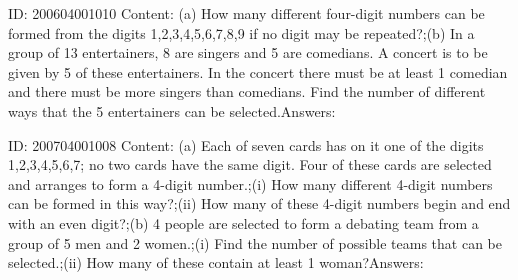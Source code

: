 \documentclass{article}
\begin{document}
ID: 200604001010
Content:
(a)	How many different four-digit numbers can be formed from the digits 1,2,3,4,5,6,7,8,9 if no digit may be repeated?;(b)	In a group of 13 entertainers, 8 are singers and 5 are comedians. A concert is to be given by 5 of these entertainers. In the concert there must be at least 1 comedian and there must be more singers than comedians. Find the number of different ways that the 5 entertainers can be selected.Answers:

ID: 200704001008
Content:
(a)	Each of seven cards has on it one of the digits 1,2,3,4,5,6,7; no two cards have the same digit. Four of these cards are selected and arranges to form a 4-digit number.;(i)	How many different 4-digit numbers can be formed in this way?;(ii)	How many of these 4-digit numbers begin and end with an even digit?;(b)	4 people are selected to form a debating team from a group of 5 men and 2 women.;(i)	Find the number of possible teams that can be selected.;(ii)	How many of these contain at least 1 woman?Answers:
\end{document}
